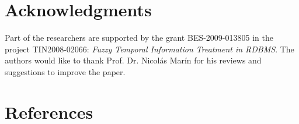 \documentclass[11pt,twoside]{article}
\def\labart{yourLabel}      %
\begin{document}
\begin{multicols}{2}
%
%
%
%
%

\section*{Acknowledgments}
Part of the researchers are supported by the grant BES-2009-013805 in the project TIN2008-02066: \emph{Fuzzy Temporal Information Treatment in RDBMS}. The authors would like to  thank Prof. Dr. Nicol\'as Mar\'in for his reviews and suggestions to improve the paper.






\section*{References}



\end{multicols}
\end{document}
